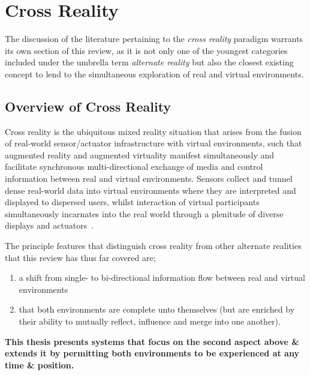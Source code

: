 
\section{Cross Reality}

\label{sec:cross_reality}
The discussion of the literature pertaining to the \textit{cross reality} paradigm warrants its own section of this review, as it is not only one of the youngest categories included under the umbrella term \textit{alternate reality} but also the closest existing concept to lend to the simultaneous exploration of real and virtual environments.

\subsection{Overview of Cross Reality}
Cross reality is the ubiquitous mixed reality situation that arises from the fusion of real-world sensor/actuator infrastructure with virtual environments, such that augmented reality and augmented virtuality manifest simultaneously and facilitate synchronous multi-directional exchange of media and control information between real and virtual environments. Sensors collect and tunnel dense real-world data into virtual environments where they are interpreted and displayed to dispersed users, whilst interaction of virtual participants simultaneously incarnates into the real world through a plenitude of diverse displays and actuators~\cite{Paradiso2009}.

The principle features that distinguish cross reality from other alternate realities that this review has thus far covered are;
\begin{enumerate}
	\item a shift from single- to bi-directional information flow between real and virtual environments~\cite{kim:practical}
	\item that both environments are complete unto themselves (but are enriched by their ability to mutually reflect, influence and merge into one another).~\cite{lifton:merging}
\end{enumerate}

\textbf{This thesis presents systems that focus on the second aspect above \& extends it by permitting both environments to be experienced at any time \& position.}

